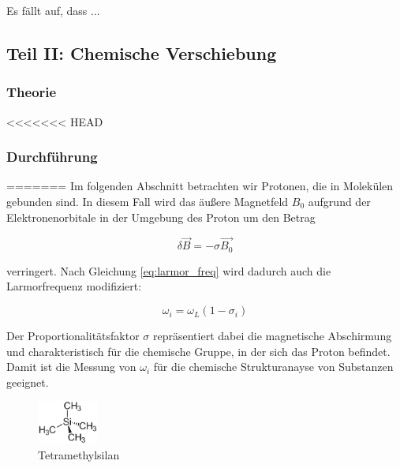 \documentclass[a4paper]{scrartcl} %
\begin{document}
Es fällt auf, dass ...

\newpage

\subsection{Teil II: Chemische Verschiebung}

\subsubsection{Theorie}

<<<<<<< HEAD
\newpage

\subsubsection{Durchführung}

=======
Im folgenden Abschnitt betrachten wir Protonen, die in Molekülen gebunden sind. In diesem Fall wird das äußere Magnetfeld $B_0$ aufgrund der Elektronenorbitale in der Umgebung des Proton um den Betrag

\begin{equation}
	\delta \vec{B} = - \sigma \vec{B_0}
	\label{eq:delta_B}
\end{equation}

verringert. Nach Gleichung \eqref{eq:larmor_freq} wird dadurch auch die Larmorfrequenz modifiziert:

\begin{equation}
	\omega_i = \omega_L \left(1-\sigma_i \right)
	\label{eq:omega_i}
\end{equation}

Der Proportionalitätsfaktor $\sigma$ repräsentiert dabei die magnetische Abschirmung und charakteristisch für die chemische Gruppe, in der sich das Proton befindet. Damit ist die Messung von $\omega_i$ für die chemische Strukturanayse von Substanzen geeignet.

\begin{figure}
	\begin{center}
		\includegraphics[width = 0.18\textwidth]{./Resources/Tetramethylsilan.png}
	\end{center}
  \caption{Te\-tramethylsilan}
  \label{fig:TMS}
\end{figure}
\end{document}
